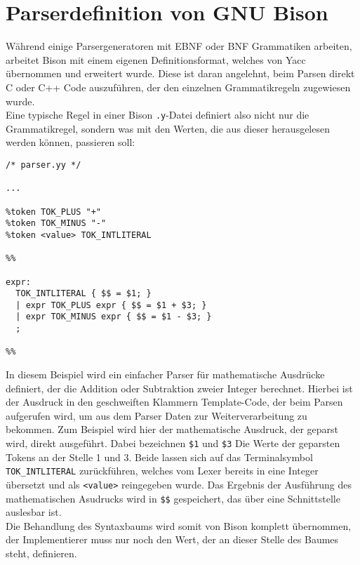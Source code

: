 \section{Parserdefinition von GNU Bison}

Während einige Parsergeneratoren mit EBNF oder BNF Grammatiken arbeiten, arbeitet Bison mit einem eigenen Definitionsformat, welches von Yacc übernommen und erweitert wurde.
Diese ist daran angelehnt, beim Parsen direkt C oder C++ Code auszuführen, der den einzelnen Grammatikregeln zugewiesen wurde.\\
Eine typische Regel in einer Bison \texttt{.y}-Datei definiert also nicht nur die Grammatikregel, sondern was mit den Werten, die aus dieser herausgelesen werden können, passieren soll:

\begin{lstlisting}[caption={Bison Beispiel}]
/* parser.yy */

...

%token TOK_PLUS "+"
%token TOK_MINUS "-"
%token <value> TOK_INTLITERAL

%%

expr:
  TOK_INTLITERAL { $$ = $1; }
  | expr TOK_PLUS expr { $$ = $1 + $3; }
  | expr TOK_MINUS expr { $$ = $1 - $3; }
  ;

%%
\end{lstlisting}

In diesem Beispiel wird ein einfacher Parser für mathematische Ausdrücke definiert, der die Addition oder Subtraktion zweier Integer berechnet.
Hierbei ist der Ausdruck in den geschweiften Klammern Template-Code, der beim Parsen aufgerufen wird, um aus dem Parser Daten zur Weiterverarbeitung zu bekommen.
Zum Beispiel wird hier der mathematische Ausdruck, der geparst wird, direkt ausgeführt.
Dabei bezeichnen \texttt{\$1} und \texttt{\$3} Die Werte der geparsten Tokens an der Stelle 1 und 3.
Beide lassen sich auf das Terminalsymbol \texttt{TOK\_INTLITERAL} zurückführen, welches vom Lexer bereits in eine Integer übersetzt und als \texttt{<value>} reingegeben wurde. 
Das Ergebnis der Ausführung des mathematischen Asudrucks wird in \texttt{\$\$} gespeichert, das über eine Schnittstelle auslesbar ist.\\
Die Behandlung des Syntaxbaums wird somit von Bison komplett übernommen, der Implementierer muss nur noch den Wert, der an dieser Stelle des Baumes steht, definieren.

